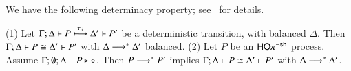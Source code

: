 \documentclass[runningheads]{llncs}
\begin{document}
{%
%
%		
%

We have the following determinacy property;
see~\cite{KouzapasPY15} for details. 


\begin{lemma}%
	\label{lem:tau_inert}
	(1)
				Let $\Gamma; \Delta \vdash P \stackrel{\tau_{d}}{\longmapsto} \Delta' \vdash P'$ be a deterministic transition,
				with balanced $\Delta$. Then 
				$\Gamma; \Delta \vdash P \cong \Delta'\vdash P'$ 
				with $\Delta \longrightarrow^\ast \Delta'$ balanced.
				(2) Let $P$ be an $\mathsf{HO}\pi^{-\mathsf{sh}}$ process. 
				Assume $\Gamma; \emptyset; \Delta \vdash P \triangleright \diamond$. Then 
				$P \longrightarrow^\ast P'$ implies $\Gamma; \Delta \vdash 
				P \cong \Delta'\vdash P'$ with $\Delta \longrightarrow^\ast \Delta'$. 
\end{lemma}


}
\end{document}
